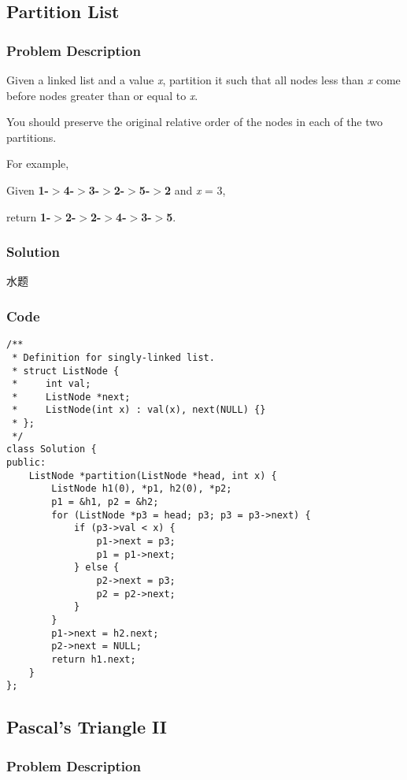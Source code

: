 \documentclass[courier]{article}
\begin{document}
\begin{CJK*}{UTF8}{gkai}
\subsection{ Partition List }

\subsubsection*{Problem Description}
Given a linked list and a value \emph{x}, partition it such that all nodes less than \emph{x} come before nodes greater than or equal to \emph{x}.

You should preserve the original relative order of the nodes in each of the two partitions.

For example,


Given \textbf{1-$>$4-$>$3-$>$2-$>$5-$>$2} and \emph{x} = 3,


return \textbf{1-$>$2-$>$2-$>$4-$>$3-$>$5}.



\subsubsection*{Solution}
水题

\subsubsection*{Code}
\begin{lstlisting}
/**
 * Definition for singly-linked list.
 * struct ListNode {
 *     int val;
 *     ListNode *next;
 *     ListNode(int x) : val(x), next(NULL) {}
 * };
 */
class Solution {
public:
    ListNode *partition(ListNode *head, int x) {
        ListNode h1(0), *p1, h2(0), *p2;
        p1 = &h1, p2 = &h2;
        for (ListNode *p3 = head; p3; p3 = p3->next) {
            if (p3->val < x) {
                p1->next = p3;
                p1 = p1->next;
            } else {
                p2->next = p3;
                p2 = p2->next;
            }
        }
        p1->next = h2.next;
        p2->next = NULL;
        return h1.next;
    }
}; 
\end{lstlisting}


\subsection{ Pascal's Triangle II }

\subsubsection*{Problem Description}



\end{CJK*}
\end{document}
